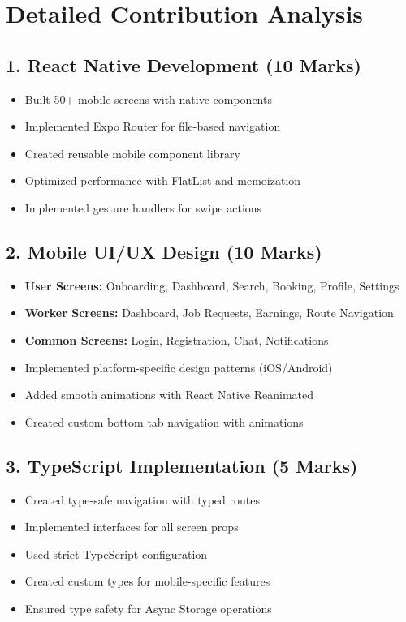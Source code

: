 \documentclass[12pt,a4paper]{article}
\begin{document}
\newpage

\section*{Detailed Contribution Analysis}

\subsection*{1. React Native Development (10 Marks)}
\begin{itemize}[leftmargin=*]
    \item Built 50+ mobile screens with native components
    \item Implemented Expo Router for file-based navigation
    \item Created reusable mobile component library
    \item Optimized performance with FlatList and memoization
    \item Implemented gesture handlers for swipe actions
\end{itemize}

\subsection*{2. Mobile UI/UX Design (10 Marks)}
\begin{itemize}[leftmargin=*]
    \item \textbf{User Screens:} Onboarding, Dashboard, Search, Booking, Profile, Settings
    \item \textbf{Worker Screens:} Dashboard, Job Requests, Earnings, Route Navigation
    \item \textbf{Common Screens:} Login, Registration, Chat, Notifications
    \item Implemented platform-specific design patterns (iOS/Android)
    \item Added smooth animations with React Native Reanimated
    \item Created custom bottom tab navigation with animations
\end{itemize}

\subsection*{3. TypeScript Implementation (5 Marks)}
\begin{itemize}[leftmargin=*]
    \item Created type-safe navigation with typed routes
    \item Implemented interfaces for all screen props
    \item Used strict TypeScript configuration
    \item Created custom types for mobile-specific features
    \item Ensured type safety for Async Storage operations
\end{itemize}
\end{document}
